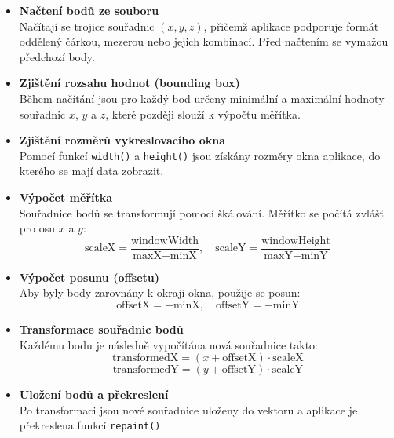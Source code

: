 \begin{itemize}
    \item \textbf{Načtení bodů ze souboru} \\
    Načítají se trojice souřadnic $(x, y, z)$, přičemž aplikace podporuje formát oddělený čárkou, mezerou nebo jejich kombinací. Před načtením se vymažou předchozí body.

    \item \textbf{Zjištění rozsahu hodnot (bounding box)} \\
    Během načítání jsou pro každý bod určeny minimální a maximální hodnoty souřadnic $x$, $y$ a $z$, které později slouží k výpočtu měřítka.

    \item \textbf{Zjištění rozměrů vykreslovacího okna} \\
    Pomocí funkcí \texttt{width()} a \texttt{height()} jsou získány rozměry okna aplikace, do kterého se mají data zobrazit.

    \item \textbf{Výpočet měřítka} \\
    Souřadnice bodů se transformují pomocí škálování. Měřítko se počítá zvlášť pro osu $x$ a $y$:
    \begin{equation}
        \text{scaleX} = \frac{\text{windowWidth}}{\text{maxX} - \text{minX}}, \quad
        \text{scaleY} = \frac{\text{windowHeight}}{\text{maxY} - \text{minY}}
    \end{equation}

    \item \textbf{Výpočet posunu (offsetu)} \\
    Aby byly body zarovnány k okraji okna, použije se posun:
    \begin{equation}
        \text{offsetX} = -\text{minX}, \quad \text{offsetY} = -\text{minY}
    \end{equation}

    \item \textbf{Transformace souřadnic bodů} \\
    Každému bodu je následně vypočítána nová souřadnice takto:
    \begin{equation}
        \text{transformedX} = (x + \text{offsetX}) \cdot \text{scaleX}
    \end{equation}
    \begin{equation}
        \text{transformedY} = (y + \text{offsetY}) \cdot \text{scaleY}
    \end{equation}

    \item \textbf{Uložení bodů a překreslení} \\
    Po transformaci jsou nové souřadnice uloženy do vektoru a aplikace je překreslena funkcí \texttt{repaint()}.
\end{itemize}
